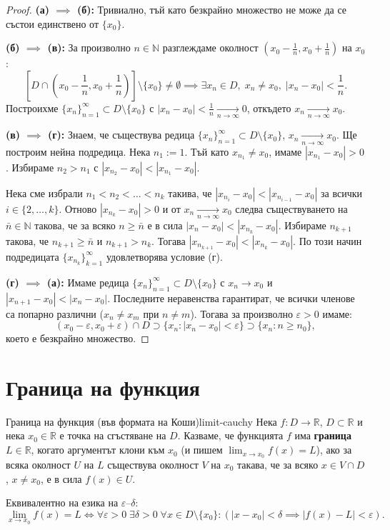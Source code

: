 \begin{proof}
\textbf{(а) $\implies$ (б):} Тривиално, тъй като безкрайно множество не може да се състои единствено от $\{x_0\}$.

\textbf{(б) $\implies$ (в):} За произволно $n \in \mathbb{N}$ разглеждаме околност $\left(x_0 - \frac{1}{n}, x_0 + \frac{1}{n}\right)$ на $x_0$:
\[
\left[ D \cap \left(x_0 - \frac{1}{n}, x_0 + \frac{1}{n}\right) \right] \setminus \{x_0\} \ne \emptyset \implies \exists x_n \in D, \; x_n \ne x_0, \; |x_n - x_0| < \frac{1}{n}.
\]
Построихме $\{x_n\}_{n=1}^{\infty} \subset D \setminus \{x_0\}$ с $|x_n - x_0| < \frac{1}{n} \xrightarrow[n\to\infty]{} 0$, откъдето $x_n \xrightarrow[n\to\infty]{} x_0$.

\textbf{(в) $\implies$ (г):} Знаем, че съществува редица $\{x_n\}_{n=1}^{\infty} \subset D \setminus \{x_0\}$, $x_n \xrightarrow[n\to\infty]{} x_0$. Ще построим нейна подредица. Нека $n_1 := 1$. Тъй като $x_{n_1} \ne x_0$, имаме $|x_{n_1} - x_0| > 0$. Избираме $n_2 > n_1$ с $|x_{n_2} - x_0| < |x_{n_1} - x_0|$.

Нека сме избрали $n_1 < n_2 < \dots < n_k$ такива, че $|x_{n_i} - x_0| < |x_{n_{i-1}} - x_0|$ за всички $i \in \{2, \dots, k\}$. Отново $|x_{n_k} - x_0| > 0$ и от $x_n \xrightarrow[n\to\infty]{} x_0$ следва съществуването на $\bar{n} \in \mathbb{N}$ такова, че за всяко $n \ge \bar{n}$ е в сила $|x_n - x_0| < |x_{n_k} - x_0|$. Избираме $n_{k+1}$ такова, че $n_{k+1} \ge \bar{n}$ и $n_{k+1} > n_k$. Тогава $|x_{n_{k+1}} - x_0| < |x_{n_k} - x_0|$. По този начин подредицата $\{x_{n_k}\}_{k=1}^{\infty}$ удовлетворява условие (г).

\textbf{(г) $\implies$ (а):} Имаме редица $\{x_n\}_{n=1}^{\infty} \subset D \setminus \{x_0\}$ с $x_n \to x_0$ и $|x_{n+1} - x_0| < |x_n - x_0|$. Последните неравенства гарантират, че всички членове са попарно различни ($x_n \ne x_m$ при $n \ne m$). Тогава за произволно $\varepsilon > 0$ имаме:
\[
(x_0 - \varepsilon, x_0 + \varepsilon) \cap D \supset \{x_n : |x_n - x_0| < \varepsilon\} \supset \{x_n : n \ge n_0\},
\]
което е безкрайно множество.
\end{proof}

\section{Граница на функция}
\begin{definition}{Граница на функция (във формата на Коши)}{limit-cauchy}
Нека $f \colon D \to \mathbb{R}$, $D \subset \mathbb{R}$ и нека $x_0 \in \mathbb{R}$ е точка на сгъстяване на $D$. Казваме, че функцията $f$ има \textbf{граница} $L \in \mathbb{R}$, когато аргументът клони към $x_0$ (и пишем $\lim_{x\to x_0} f(x) = L$), ако за всяка околност $U$ на $L$ съществува околност $V$ на $x_0$ такава, че за всяко $x \in V \cap D$, $x \ne x_0$, е в сила $f(x) \in U$.

Еквивалентно на езика на $\varepsilon$--$\delta$:
\[
\lim_{x\to x_0} f(x) = L \iff \forall \varepsilon > 0 \; \exists \delta > 0 \; \forall x \in D \setminus \{x_0\} \colon (|x - x_0| < \delta \implies |f(x) - L| < \varepsilon).
\]
\end{definition}

